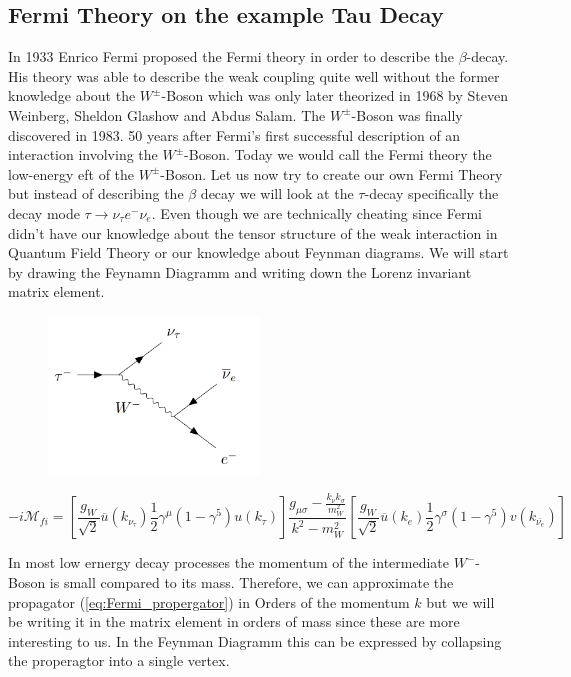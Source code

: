 \documentclass[../Bachelorarbeit.tex]{subfiles}
\begin{document}
\subsection{Fermi Theory on the example Tau Decay}
\label{sec:Fermi}
In 1933 Enrico Fermi proposed the Fermi theory in order to describe the $\beta$-decay. His theory was able to describe the
weak coupling quite well without the former knowledge about the $W^{\pm}$-Boson which was only later theorized in 1968 by Steven Weinberg, Sheldon Glashow and Abdus Salam.
The $W^{\pm}$-Boson was finally discovered in 1983. 50 years after Fermi's first successful description of an interaction involving the $W^{\pm}$-Boson.
Today we would call the Fermi theory the low-energy \acrshort{eft} of the $W^{\pm}$-Boson.
Let us now try to create our own Fermi Theory but instead of describing the $\beta$ decay we will look at the $\tau$-decay specifically the decay mode $\tau \rightarrow \nu_{\tau}e^{-}\nu_{e}$.
Even though we are technically cheating since Fermi didn't have our knowledge about the tensor structure of the weak interaction in Quantum Field Theory or our knowledge about Feynman diagrams.
We will start by drawing the Feynamn Diagramm and writing down the Lorenz invariant matrix element.
\begin{figure}[h]
    \centering
    \includegraphics[width=0.5\textwidth]{images/Feynamn_tau_decay.PNG}
\end{figure}

\begin{equation}
    -i\mathcal{M}_{fi}= \left[ \frac{g_{W}}{\sqrt{2}} \overline{u}(k_{\nu_{\tau}})\frac{1}{2}\gamma^{\mu}(1-\gamma^{5})u(k_{\tau}) \right] \frac{g_{\mu\sigma}-\frac{k_{\nu}k_{\sigma}}{m_{W}^{2}}}{k^{2}-m_{W}^{2}} \left[ \frac{g_{W}}{\sqrt{2}} \overline{u}(k_{e})\frac{1}{2}\gamma^{\sigma}(1-\gamma^{5})v(k_{\overline{\nu_{e}}}) \right]
\end{equation}

In most low ernergy decay processes the momentum of the intermediate $W^{-}$-Boson is small compared to its mass. Therefore, we can approximate the
propagator (\ref{eq:Fermi_propergator}) in Orders of the momentum $k$ but we will be writing it in the matrix element in orders
of mass since these are more interesting to us. In the Feynman Diagramm this can be expressed by collapsing the properagtor into a single vertex.
\end{document}
